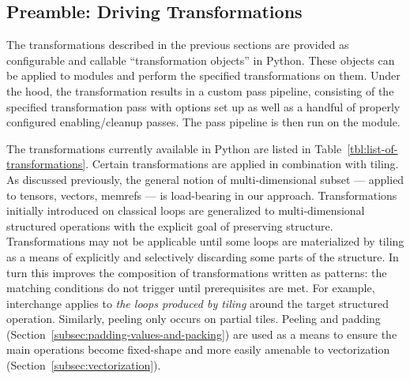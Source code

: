 \subsection{Preamble: Driving Transformations}
The transformations described in the previous sections are provided as configurable and callable ``transformation objects'' in Python.
These objects can be applied to \MLIR modules and perform the specified transformations on them.
Under the hood, the transformation results in a custom pass pipeline, consisting of the specified transformation pass with options set up as well as a handful of properly configured enabling/cleanup passes.
The pass pipeline is then run on the module.

The transformations currently available in Python are listed in Table~\ref{tbl:list-of-transformations}.
Certain transformations are applied in combination with tiling.
As discussed previously, the general notion of multi-dimensional subset --- applied to tensors, vectors, memrefs --- is load-bearing in our approach.
Transformations initially introduced on classical loops are generalized to multi-dimensional structured operations with the explicit goal of preserving structure.
Transformations may not be applicable until some loops are materialized by tiling as a means of explicitly and selectively discarding some parts of the structure.
In turn this improves the composition of transformations written as patterns: the matching conditions do not trigger until prerequisites are met.
For example, interchange applies to \emph{the loops produced by tiling} around the target structured operation.
Similarly, peeling only occurs on partial tiles.
Peeling and padding (Section~\ref{subsec:padding-values-and-packing}) are used as a means to ensure the main operations become fixed-shape and more easily amenable to vectorization (Section~\ref{subsec:vectorization}).


